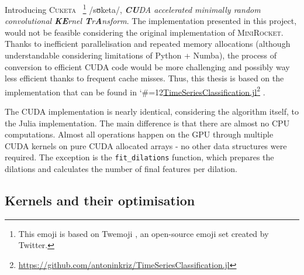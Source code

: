 \documentclass{article}
\newcommand\footlink{\begingroup\catcode`\#=12\relax\linkk}
\newcommand\linkk[2]{\endgroup\href{#1}{#2}\footnote{\raggedright\scriptsize\sloppy\url{#1}}}
\newcommand\MINIROCKET{\textsc{MiniRocket}\xspace}
\newcommand\CUKETA{\textsc{Cuketa}\xspace}
\newcommand{\emjl}[1]{\raisebox{-1.5pt}{\large\texttwemoji{#1}}}
\begin{document}
Introducing \CUKETA~\emjl{zucchini} \footnote{This emoji is based on Twemoji \cite{emoji}, an open-source emoji set created by Twitter.} /sʊketa/, \emph{\textbf{CU}DA accelerated minimally random convolutional \textbf{KE}rnel \textbf{T}r\textbf{A}nsform}. The implementation presented in this project, would not be feasible considering the original implementation of \MINIROCKET. Thanks to inefficient parallelisation and repeated memory allocations (although understandable considering limitations of Python + Numba), the process of conversion to efficient CUDA code would be more challenging and possibly way less efficient thanks to frequent cache misses. Thus, this thesis is based on the implementation that can be found in \footlink{https://github.com/antoninkriz/TimeSeriesClassification.jl}{TimeSeriesClassification.jl} \cite{tscjulia}.

The CUDA implementation is nearly identical, considering the algorithm itself, to the Julia implementation. The main difference is that there are almost no CPU computations. Almost all operations happen on the GPU through multiple CUDA kernels on pure CUDA allocated arrays - no other data structures were required. The exception is the \texttt{fit_dilations} function, which prepares the dilations and calculates the number of final features per dilation.

\subsection{Kernels and their optimisation}
\end{document}
